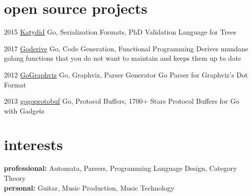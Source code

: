 \documentclass[]{friggeri-cv-a4} %
\begin{document}
\section{open source projects}

\begin{entrylist}

\entry
{2015}
{\href{https://github.com/katydid/katydid}{Katydid}}
{Go, Serialization Formats, PhD}
{Validation Language for Trees}

\entry
{2017}
{\href{https://github.com/awalterschulze/goderive}{Goderive}}
{Go, Code Generation, Functional Programming}
{Derives mundane golang functions that you do not want to maintain and keeps them up to date}

\entry
{2012}
{\href{https://github.com/awalterschulze/gographviz}{GoGraphviz}}
{Go, Graphviz, Parser Generator}
{Go Parser for Graphviz's Dot Format}

\entry
{2013}
{\href{https://github.com/gogo/protobuf}{gogoprotobuf}}
{Go, Protocol Buffers, 1700+ Stars}
{Protocol Buffers for Go with Gadgets}

\end{entrylist}

\section{interests}

\textbf{professional:} Automata, Parsers, Programming Language Design, Category Theory \\
\textbf{personal:} Guitar, Music Production, Music Technology
\end{document}
